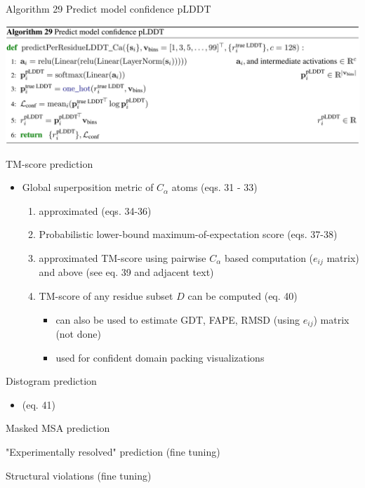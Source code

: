 \documentclass[presentation, smaller]{beamer}
\begin{document}
\begin{frame}[label={sec:org304bf94}]{Algorithm 29 Predict model confidence pLDDT \cite{jumperHighlyAccurateProtein2021}}
\begin{center}
\includegraphics[width=.9\linewidth]{./imgs/algo29_confidence-pLDDT.png}
\end{center}
\end{frame}
\begin{frame}[label={sec:orge9fb894}]{TM-score prediction  \cite{jumperHighlyAccurateProtein2021}}
\begin{itemize}
\item Global superposition metric of \(C_\alpha\) atoms (eqs. 31 - 33)
\begin{enumerate}
\item approximated (eqs. 34-36)
\item Probabilistic lower-bound maximum-of-expectation score (eqs. 37-38)
\item approximated TM-score using pairwise \(C_\alpha\) based computation (\(e_{ij}\) matrix) and above (see eq. 39 and adjacent text)
\item TM-score of any residue subset \(D\) can be computed (eq. 40)
\begin{itemize}
\item can also be used to estimate GDT, FAPE, RMSD (using \(e_{ij}\)) matrix (not done)
\item used for confident domain packing visualizations
\end{itemize}
\end{enumerate}
\end{itemize}
\end{frame}

\begin{frame}[label={sec:org009ecd7}]{Distogram prediction  \cite{jumperHighlyAccurateProtein2021}}
\begin{itemize}
\item (eq. 41)
\end{itemize}
\end{frame}
\begin{frame}[label={sec:org80aeec3}]{Masked MSA prediction  \cite{jumperHighlyAccurateProtein2021}}
\end{frame}
\begin{frame}[label={sec:org1425f9b}]{"Experimentally resolved" prediction (fine tuning) \cite{jumperHighlyAccurateProtein2021}}
\end{frame}
\begin{frame}[label={sec:orgfce5f2e}]{Structural violations (fine tuning)  \cite{jumperHighlyAccurateProtein2021}}
\end{frame}
\end{document}
